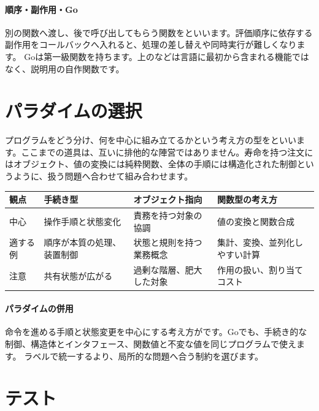 \paragraph{順序・副作用・Go}
        別の関数へ渡し、後で呼び出してもらう関数をといいます。評価順序に依存する副作用をコールバックへ入れると、処理の差し替えや同時実行が難しくなります。
        Goは第一級関数を持ちます。上のなどは言語に最初から含まれる機能ではなく、説明用の自作関数です。

\par
\endgroup
\par
\endgroup


\section{パラダイムの選択}
\label{sec:04-software-engineering-17}

プログラムをどう分け、何を中心に組み立てるかという考え方の型をといいます。ここまでの道具は、互いに排他的な陣営ではありません。寿命を持つ注文にはオブジェクト、値の変換には純粋関数、全体の手順には構造化された制御というように、扱う問題へ合わせて組み合わせます。

\begingroup
  \noindent
  \begin{tabularx}{\textwidth}{@{}lYYY@{}}
    \toprule
    観点 & 手続き型 & オブジェクト指向 & 関数型の考え方\\
    \midrule
    中心 & 操作手順と状態変化 & 責務を持つ対象の協調 & 値の変換と関数合成\\
    適する例 & 順序が本質の処理、装置制御 & 状態と規則を持つ業務概念 & 集計、変換、並列化しやすい計算\\
    注意 & 共有状態が広がる & 過剰な階層、肥大した対象 & 作用の扱い、割り当てコスト\\
    \bottomrule
  \end{tabularx}
  \vspace{4mm}
\paragraph{パラダイムの併用}
    命令を進める手順と状態変更を中心にする考え方がです。Goでも、手続き的な制御、構造体とインタフェース、関数値と不変な値を同じプログラムで使えます。
    ラベルで統一するより、局所的な問題へ合う制約を選びます。

\par
\endgroup


\section{テスト}
\label{sec:04-software-engineering-18}

